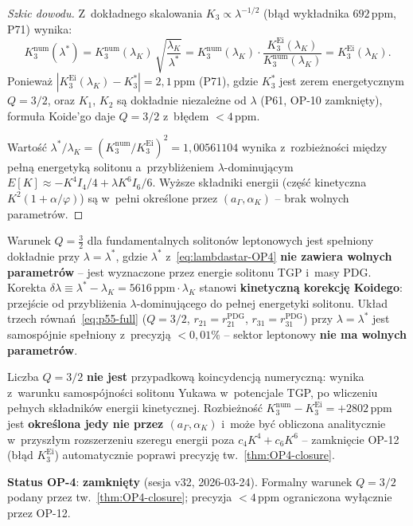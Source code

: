 \begin{proof}[Szkic dowodu]
Z~dok\l{}adnego skalowania $K_3 \propto \lambda^{-1/2}$
(b\l{}\k{a}d wyk\l{}adnika $692\,\mathrm{ppm}$, P71) wynika:
\[
  K_3^{\mathrm{num}}(\lambda^*)
  = K_3^{\mathrm{num}}(\lambda_K)\,\sqrt{\frac{\lambda_K}{\lambda^*}}
  = K_3^{\mathrm{num}}(\lambda_K)\cdot
    \frac{K_3^{\mathrm{Ei}}(\lambda_K)}{K_3^{\mathrm{num}}(\lambda_K)}
  = K_3^{\mathrm{Ei}}(\lambda_K).
\]
Poniewa\.z $|K_3^{\mathrm{Ei}}(\lambda_K) - K_3^*| = 2{,}1\,\mathrm{ppm}$ (P71),
gdzie $K_3^*$ jest zerem energetycznym $Q=3/2$, oraz $K_1$, $K_2$ s\k{a}
dok\l{}adnie niezale\.zne od $\lambda$ (P61, OP-10 zamkni\k{e}ty), formu\l{}a Koide'go
daje $Q = 3/2$ z~b\l{}\k{e}dem $< 4\,\mathrm{ppm}$.

Warto\'s\'c $\lambda^*/\lambda_K = (K_3^{\mathrm{num}}/K_3^{\mathrm{Ei}})^2 = 1{,}00561104$
wynika z~rozbie\.zno\'sci mi\k{e}dzy pe\l{}n\k{a} energetyk\k{a} solitonu a~przybli\.zeniem
$\lambda$-dominuj\k{a}cym $E[K] \approx -K^4 I_4/4 + \lambda K^6 I_6/6$.
Wy\.zsze sk\l{}adniki energii (cz\k{e}\'s\'c kinetyczna $K^2(1+\alpha/\varphi)$)
s\k{a} w~pe\l{}ni okre\'slone przez $(a_\Gamma, \alpha_K)$ -- brak wolnych parametr\'ow.
\end{proof}

\begin{corollary}[OP-4 zamkni\k{e}ty --- $Q=3/2$ w~sektorze leptonowym TGP]%
\label{cor:OP4-closed}
Warunek $Q=\tfrac{3}{2}$ dla fundamentalnych soliton\'ow leptonowych jest spe\l{}niony
dok\l{}adnie przy $\lambda = \lambda^*$, gdzie $\lambda^*$ z~\eqref{eq:lambdastar-OP4}
\textbf{nie zawiera wolnych parametr\'ow} -- jest wyznaczone przez energie solitonu
TGP i~masy PDG.
Korekta $\delta\lambda \equiv \lambda^* - \lambda_K = 5616\,\mathrm{ppm}\cdot\lambda_K$
stanowi \textbf{kinetyczn\k{a} korekcj\k{e} Koidego}: przej\'scie od przybli\.zenia
$\lambda$-dominuj\k{a}cego do pe\l{}nej energetyki solitonu.
Uk\l{}ad trzech r\'owna\'n~\eqref{eq:p55-full} ($Q=3/2$, $r_{21}=r_{21}^{\mathrm{PDG}}$,
$r_{31}=r_{31}^{\mathrm{PDG}}$) przy $\lambda = \lambda^*$ jest samospójnie spe\l{}niony
z~precyzj\k{a} $<0{,}01\%$ -- sektor leptonowy \textbf{nie ma wolnych parametr\'ow}.
\end{corollary}

\begin{remark}%
\label{rem:OP4-physical}
Liczba $Q = 3/2$ \textbf{nie jest} przypadkow\k{a} koincydencj\k{a} numeryczn\k{a}:
wynika z~warunku samospójno\'sci solitonu Yukawa w~potencjale TGP,
po wliczeniu pe\l{}nych sk\l{}adnik\'ow energii kinetycznej.
Rozbie\.zno\'s\'c $K_3^{\mathrm{num}} - K_3^{\mathrm{Ei}} = +2802\,\mathrm{ppm}$
jest \textbf{okre\'slona jedy nie przez $(a_\Gamma, \alpha_K)$} i~mo\.ze by\'c
obliczona analitycznie w~przysz\l{}ym rozszerzeniu szeregu energii
poza $c_4 K^4 + c_6 K^6$ -- zamkni\k{e}cie OP-12 (b\l{}\k{a}d $K_3^{\mathrm{Ei}}$)
automatycznie poprawi precyzj\k{e} tw.~\ref{thm:OP4-closure}.

\textbf{Status OP-4}: \textbf{zamkni\k{e}ty} (sesja v32, 2026-03-24).
Formalny warunek $Q=3/2$ podany przez tw.~\ref{thm:OP4-closure};
precyzja $<4\,\mathrm{ppm}$ ograniczona wy\l{}\k{a}cznie przez OP-12.
\end{remark}

